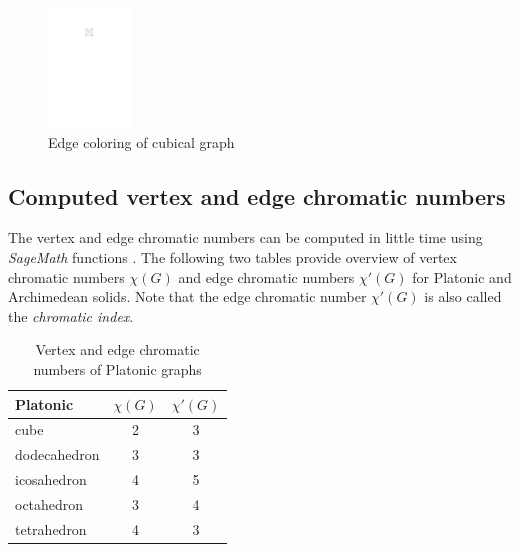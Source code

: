 \begin{figure}[H]
    \centering
    \includegraphics[width=0.2\textwidth]{../Resources/Figs/cubical_edg_colr.pdf}
    \caption{Edge coloring of cubical graph}
    \label{fig:cubical_edge_coloring}
\end{figure}

\subsection{Computed vertex and edge chromatic numbers}

The vertex and edge chromatic numbers can be computed in little time using \textit{SageMath} functions \cite{sagemath-chromatic-number} \cite{sagemath-chromatic-index}. The following two tables provide overview of vertex chromatic numbers $\chi(G)$  and edge chromatic numbers $\chi'(G)$ for Platonic and Archimedean solids. Note that the edge chromatic number $\chi'(G)$ is also called the \textit{chromatic index}.

\begin{table}[H]
    \centering
    \caption{Vertex and edge chromatic numbers of Platonic graphs}
    \vspace{5pt}
    \label{tab:platonic-chrom-nums}
    \begin{tabular}{|l|c|c|}
    \hline
    Platonic & $\chi(G)$ & $\chi'(G)$ \\
    \hline\hline
    cube & 2 & 3 \\
    \hline
    dodecahedron & 3 & 3 \\
    \hline
    icosahedron & 4 & 5 \\
    \hline
    octahedron & 3 & 4 \\
    \hline
    tetrahedron & 4 & 3 \\
    \hline
    \end{tabular}
\end{table}

